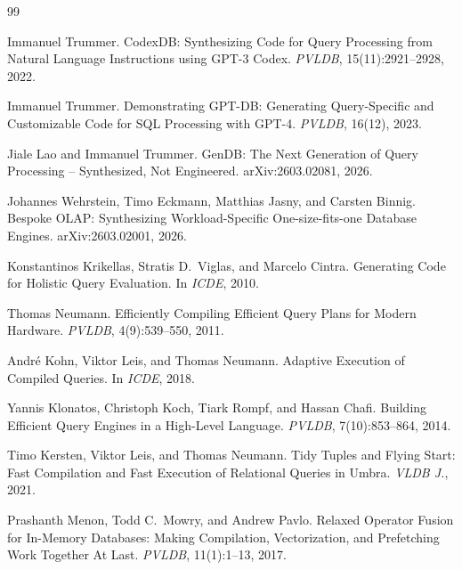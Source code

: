 \documentclass[sigconf, nonacm]{acmart}
\begin{document}
\begin{thebibliography}{99}

Immanuel Trummer.
\newblock CodexDB: Synthesizing Code for Query Processing from Natural Language Instructions using GPT-3 Codex.
\newblock \emph{PVLDB}, 15(11):2921--2928, 2022.

Immanuel Trummer.
\newblock Demonstrating GPT-DB: Generating Query-Specific and Customizable Code for SQL Processing with GPT-4.
\newblock \emph{PVLDB}, 16(12), 2023.

Jiale Lao and Immanuel Trummer.
\newblock GenDB: The Next Generation of Query Processing -- Synthesized, Not Engineered.
\newblock arXiv:2603.02081, 2026.

Johannes Wehrstein, Timo Eckmann, Matthias Jasny, and Carsten Binnig.
\newblock Bespoke OLAP: Synthesizing Workload-Specific One-size-fits-one Database Engines.
\newblock arXiv:2603.02001, 2026.

Konstantinos Krikellas, Stratis D.\ Viglas, and Marcelo Cintra.
\newblock Generating Code for Holistic Query Evaluation.
\newblock In \emph{ICDE}, 2010.

Thomas Neumann.
\newblock Efficiently Compiling Efficient Query Plans for Modern Hardware.
\newblock \emph{PVLDB}, 4(9):539--550, 2011.

Andr{\'e} Kohn, Viktor Leis, and Thomas Neumann.
\newblock Adaptive Execution of Compiled Queries.
\newblock In \emph{ICDE}, 2018.

Yannis Klonatos, Christoph Koch, Tiark Rompf, and Hassan Chafi.
\newblock Building Efficient Query Engines in a High-Level Language.
\newblock \emph{PVLDB}, 7(10):853--864, 2014.

Timo Kersten, Viktor Leis, and Thomas Neumann.
\newblock Tidy Tuples and Flying Start: Fast Compilation and Fast Execution of Relational Queries in Umbra.
\newblock \emph{VLDB J.}, 2021.

Prashanth Menon, Todd C.\ Mowry, and Andrew Pavlo.
\newblock Relaxed Operator Fusion for In-Memory Databases: Making Compilation, Vectorization, and Prefetching Work Together At Last.
\newblock \emph{PVLDB}, 11(1):1--13, 2017.


\end{thebibliography}
\end{document}
